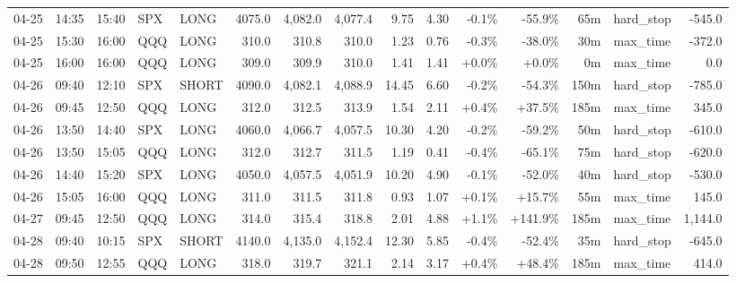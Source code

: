 \documentclass[11pt,a4paper,twoside]{article}
\begin{document}
\begin{landscape}
\begin{center}
\begin{longtable}{>{\color{txtmain}}l l l l l r r r r r r r r >{\color{txtmain}}l r}
04-25 & 14:35 & 15:40 & SPX & LONG & 4075.0 & 4,082.0 & 4,077.4 & 9.75 & 4.30 & \textcolor{lossred}{-0.1\%} & \textcolor{lossred}{-55.9\%} & 65m & hard\_stop & \textcolor{lossred}{-545.0} \\
04-25 & 15:30 & 16:00 & QQQ & LONG & 310.0 & 310.8 & 310.0 & 1.23 & 0.76 & \textcolor{lossred}{-0.3\%} & \textcolor{lossred}{-38.0\%} & 30m & max\_time & \textcolor{lossred}{-372.0} \\
04-25 & 16:00 & 16:00 & QQQ & LONG & 309.0 & 309.9 & 310.0 & 1.41 & 1.41 & \textcolor{wingreen}{+0.0\%} & \textcolor{wingreen}{+0.0\%} & 0m & max\_time & \textcolor{wingreen}{0.0} \\
04-26 & 09:40 & 12:10 & SPX & SHORT & 4090.0 & 4,082.1 & 4,088.9 & 14.45 & 6.60 & \textcolor{lossred}{-0.2\%} & \textcolor{lossred}{-54.3\%} & 150m & hard\_stop & \textcolor{lossred}{-785.0} \\
04-26 & 09:45 & 12:50 & QQQ & LONG & 312.0 & 312.5 & 313.9 & 1.54 & 2.11 & \textcolor{wingreen}{+0.4\%} & \textcolor{wingreen}{+37.5\%} & 185m & max\_time & \textcolor{wingreen}{345.0} \\
04-26 & 13:50 & 14:40 & SPX & LONG & 4060.0 & 4,066.7 & 4,057.5 & 10.30 & 4.20 & \textcolor{lossred}{-0.2\%} & \textcolor{lossred}{-59.2\%} & 50m & hard\_stop & \textcolor{lossred}{-610.0} \\
04-26 & 13:50 & 15:05 & QQQ & LONG & 312.0 & 312.7 & 311.5 & 1.19 & 0.41 & \textcolor{lossred}{-0.4\%} & \textcolor{lossred}{-65.1\%} & 75m & hard\_stop & \textcolor{lossred}{-620.0} \\
04-26 & 14:40 & 15:20 & SPX & LONG & 4050.0 & 4,057.5 & 4,051.9 & 10.20 & 4.90 & \textcolor{lossred}{-0.1\%} & \textcolor{lossred}{-52.0\%} & 40m & hard\_stop & \textcolor{lossred}{-530.0} \\
04-26 & 15:05 & 16:00 & QQQ & LONG & 311.0 & 311.5 & 311.8 & 0.93 & 1.07 & \textcolor{wingreen}{+0.1\%} & \textcolor{wingreen}{+15.7\%} & 55m & max\_time & \textcolor{wingreen}{145.0} \\
04-27 & 09:45 & 12:50 & QQQ & LONG & 314.0 & 315.4 & 318.8 & 2.01 & 4.88 & \textcolor{wingreen}{+1.1\%} & \textcolor{wingreen}{+141.9\%} & 185m & max\_time & \textcolor{wingreen}{1,144.0} \\
04-28 & 09:40 & 10:15 & SPX & SHORT & 4140.0 & 4,135.0 & 4,152.4 & 12.30 & 5.85 & \textcolor{lossred}{-0.4\%} & \textcolor{lossred}{-52.4\%} & 35m & hard\_stop & \textcolor{lossred}{-645.0} \\
04-28 & 09:50 & 12:55 & QQQ & LONG & 318.0 & 319.7 & 321.1 & 2.14 & 3.17 & \textcolor{wingreen}{+0.4\%} & \textcolor{wingreen}{+48.4\%} & 185m & max\_time & \textcolor{wingreen}{414.0} \\

\end{longtable}
\end{center}
\end{landscape}
\end{document}
